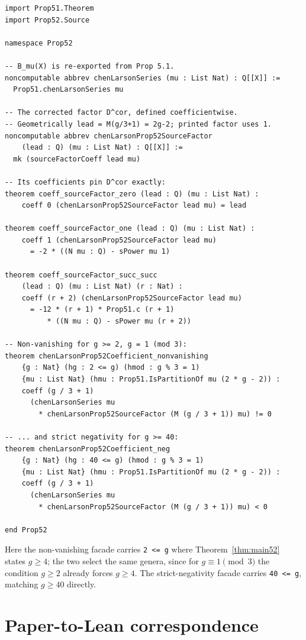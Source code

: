 \documentclass[11pt]{article}
\theoremstyle{definition}
\theoremstyle{remark}
\newcommand{\code}[1]{\texttt{#1}}
\begin{document}
\begin{lstlisting}
import Prop51.Theorem
import Prop52.Source

namespace Prop52

-- B_mu(X) is re-exported from Prop 5.1.
noncomputable abbrev chenLarsonSeries (mu : List Nat) : Q[[X]] :=
  Prop51.chenLarsonSeries mu

-- The corrected factor D^cor, defined coefficientwise.
-- Geometrically lead = M(g/3+1) = 2g-2; printed factor uses 1.
noncomputable abbrev chenLarsonProp52SourceFactor
    (lead : Q) (mu : List Nat) : Q[[X]] :=
  mk (sourceFactorCoeff lead mu)

-- Its coefficients pin D^cor exactly:
theorem coeff_sourceFactor_zero (lead : Q) (mu : List Nat) :
    coeff 0 (chenLarsonProp52SourceFactor lead mu) = lead

theorem coeff_sourceFactor_one (lead : Q) (mu : List Nat) :
    coeff 1 (chenLarsonProp52SourceFactor lead mu)
      = -2 * ((N mu : Q) - sPower mu 1)

theorem coeff_sourceFactor_succ_succ
    (lead : Q) (mu : List Nat) (r : Nat) :
    coeff (r + 2) (chenLarsonProp52SourceFactor lead mu)
      = -12 * (r + 1) * Prop51.c (r + 1)
          * ((N mu : Q) - sPower mu (r + 2))

-- Non-vanishing for g >= 2, g = 1 (mod 3):
theorem chenLarsonProp52Coefficient_nonvanishing
    {g : Nat} (hg : 2 <= g) (hmod : g % 3 = 1)
    {mu : List Nat} (hmu : Prop51.IsPartitionOf mu (2 * g - 2)) :
    coeff (g / 3 + 1)
      (chenLarsonSeries mu
        * chenLarsonProp52SourceFactor (M (g / 3 + 1)) mu) != 0

-- ... and strict negativity for g >= 40:
theorem chenLarsonProp52Coefficient_neg
    {g : Nat} (hg : 40 <= g) (hmod : g % 3 = 1)
    {mu : List Nat} (hmu : Prop51.IsPartitionOf mu (2 * g - 2)) :
    coeff (g / 3 + 1)
      (chenLarsonSeries mu
        * chenLarsonProp52SourceFactor (M (g / 3 + 1)) mu) < 0

end Prop52
\end{lstlisting}

Here the non-vanishing facade carries \code{2 <= g} where
Theorem~\ref{thm:main52} states $g\ge4$; the two select the same genera, since
for $g\equiv1\pmod3$ the condition $g\ge2$ already forces $g\ge4$.  The
strict-negativity facade carries \code{40 <= g}, matching $g\ge40$ directly.

\section{Paper-to-Lean correspondence}\label{app:map}
\end{document}
